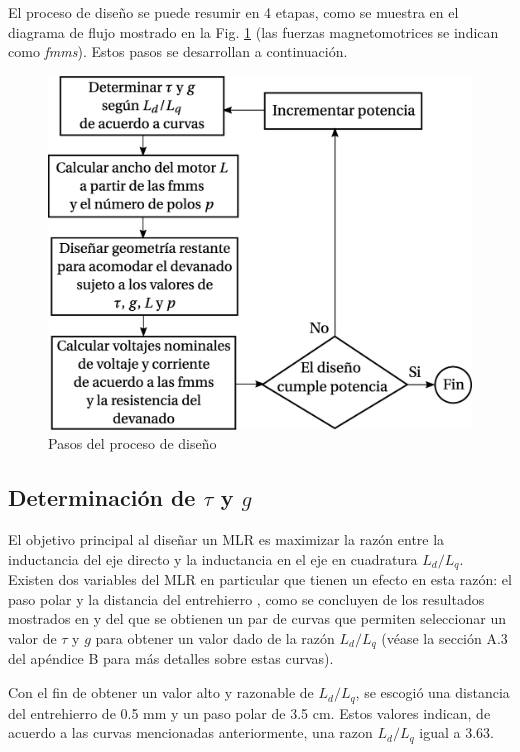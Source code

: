 El proceso de diseño se puede resumir en 4 etapas, como se muestra en el diagrama de flujo mostrado en la Fig. \ref{fig:flujodiseno} (las fuerzas magnetomotrices se indican como \textit{fmms}). Estos pasos se desarrollan a continuación.

\begin{figure}[t]
\centering
\includegraphics[scale=0.3]{../img/Desarrollo_de_un_diseno_inicial/flujodiseno.eps}
\caption{Pasos del proceso de diseño}
\label{fig:flujodiseno}
\end{figure}

\subsection{Determinación de $\tau$ y $g$}
El objetivo principal al diseñar un MLR es maximizar la razón entre la inductancia del eje directo y la inductancia en el eje en cuadratura $L_d/L_q$. Existen dos variables del MLR en particular que tienen un efecto en esta razón: el paso polar y la distancia del entrehierro \cite{boldea1994}, como  se concluyen de los resultados mostrados en \cite{boldea1994} y del que se obtienen un par de curvas que permiten seleccionar un valor de $\tau$ y $g$ para obtener un valor dado de la razón $L_d/L_q$ (véase la sección A.3 del apéndice B para más detalles sobre estas curvas).

Con el fin de obtener un valor alto y razonable de $L_d/L_q$, se escogió una distancia del entrehierro de 0.5 mm y un paso polar de 3.5 cm. Estos valores indican, de acuerdo a las curvas mencionadas anteriormente, una razon $L_d/L_q$ igual a 3.63.

